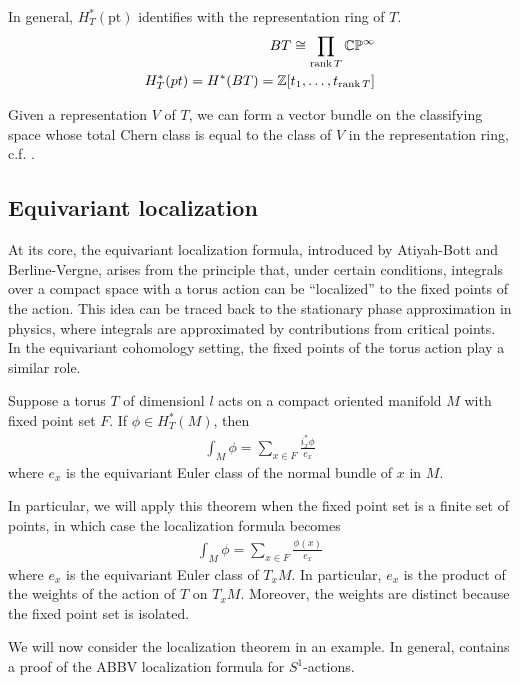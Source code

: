 \begin{example}
	In general, $H_T^*(\text{pt})$ identifies with the representation ring of $T$. \begin{align*}
		BT \cong \prod_{\operatorname{rank} T} \mathbb{C}\mathbb{P}^\infty \\
		H_T^*(pt) = H^*(BT) = \mathbb{Z}[t_1,\ldots,t_{\operatorname{rank} T}]
	\end{align*}

	Given a representation $V$ of $T$,
	we can form a vector bundle on the classifying space whose
	total Chern class is equal to the class of $V$ in the representation ring, c.f. \cite{huybrechts}.
\end{example}

\subsection{Equivariant localization}
At its core, the equivariant localization formula, introduced by Atiyah-Bott and Berline-Vergne, arises from the principle that, under certain conditions, integrals over a compact space with a torus action can be “localized” to the fixed points of the action. This idea can be traced back to the stationary phase approximation in physics, where integrals are approximated by contributions from critical points. In the equivariant cohomology setting, the fixed points of the torus action play a similar role.
\begin{theorem}
	 Suppose a torus $T$ of dimensionl $l$ acts on a
	compact oriented manifold $M$ with fixed point set $F$. If $\phi \in H^*_T(M)$, then
	\begin{align*}
		\int_M \phi = \sum_{x\in F} \frac{i^*_x\phi}{e_x}
	\end{align*} where $e_x$ is the equivariant Euler class of the normal bundle of $x$ in $M$.
\end{theorem}
In particular, we will apply this theorem when the fixed point set is a finite set of points,
in which case the localization formula becomes \begin{align*}
	\int_M \phi = \sum_{x\in F} \frac{\phi(x)}{e_x}
\end{align*} where $e_x$ is the equivariant Euler class of $T_xM$. In particular, $e_x$
is the product of the weights of the action of $T$ on $T_xM$. Moreover, the weights are
distinct because the fixed point set is isolated.

We will now consider the localization theorem in an example.
In general, \cite{tu} contains a proof of the ABBV localization formula
for $S^1$-actions.

